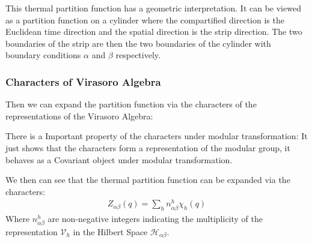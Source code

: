 This thermal partition function has a geometric interpretation. It
can be viewed as a partition function on a cylinder where the
compartified direction is the Euclidean time direction and the
spatial direction is the strip direction. The two boundaries of the
strip are then the two boundaries of the cylinder with boundary
conditions $ \alpha $ and $ \beta $ respectively.

\subsubsection{Characters of Virasoro Algebra}

Then we can expand the partition function via the characters of the
representations of the Virasoro Algebra:

There is a Important property of the characters under modular transformation:
It just shows that the characters form a representation of the
modular group, it behaves as a Covariant object under modular transformation.

We then can see that the thermal partition function can be expanded
via the characters:
\begin{align}
  Z_{\alpha \beta} (q) = \sum_{h} n_{\alpha \beta}^{h} \chi_h (q)
\end{align}
Where $ n_{\alpha \beta}^{h} $ are non-negative integers indicating
the multiplicity of the representation $ \mathcal{V}_h $ in the
Hilbert Space $ \mathcal{H}_{\alpha \beta} $.

